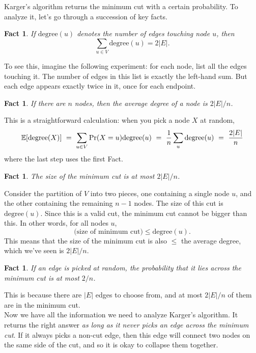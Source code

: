 \documentclass{report}
\theoremstyle{plain}
\newtheorem{fact}[lemma]{Fact}
\theoremstyle{definition}
\newcommand{\E}{\mathbb{E}}
\newcommand{\pr}{\mbox{\rm Pr}}
\begin{document}
Karger's algorithm returns the minimum cut with a certain probability. To analyze it,
let's go through a succession of key facts.

\begin{fact}
If $\mbox{degree}(u)$ denotes the number of edges touching node $u$, then
$$ \sum_{u \in V} \mbox{degree}(u) = 2|E|.$$
\end{fact}
To see this, imagine the following experiment: for each node, list all the edges touching 
it. The number of edges in this list is exactly the left-hand sum. But each edge appears 
exactly twice in it, once for each endpoint.

\begin{fact}
If there are $n$ nodes, then the average degree of a node is $2|E|/n$.
\end{fact}
This is a straightforward calculation: when you pick a node $X$ at random,
$$ 
\E[\mbox{degree}(X)] 
\ = \ 
\sum_{u \in V} \pr(X = u) \mbox{degree}(u) 
\ = \ 
\frac{1}{n} \sum_u \mbox{degree}(u) 
\ = \ 
\frac{2|E|}{n}
$$
where the last step uses the first Fact.

\begin{fact}
The size of the minimum cut is at most $2|E|/n$.
\end{fact}
Consider the partition of $V$ into two pieces, one containing a single node $u$, and the 
other containing the remaining $n-1$ nodes. The size of this cut is $\mbox{degree}(u)$.
Since this is a valid cut, the minimum cut cannot be bigger than this. In other words,
for all nodes $u$,
$$ \mbox{(size of minimum cut)} \leq \mbox{degree}(u) .$$
This means that the size of the minimum cut is also $\leq$ the average degree, which 
we've seen is $2|E|/n$.

\begin{fact}
If an edge is picked at random, the probability that it lies across the minimum cut is 
at most $2/n$.
\end{fact}
This is because there are $|E|$ edges to choose from, and at most $2|E|/n$ of them are
in the minimum cut.
\\

Now we have all the information we need to analyze Karger's algorithm. It returns the
right answer {\it as long as it never picks an edge across the minimum cut}. If it always 
picks a non-cut edge, then this edge will connect two nodes on the same side of the cut,
and so it is okay to collapse them together.
\end{document}
